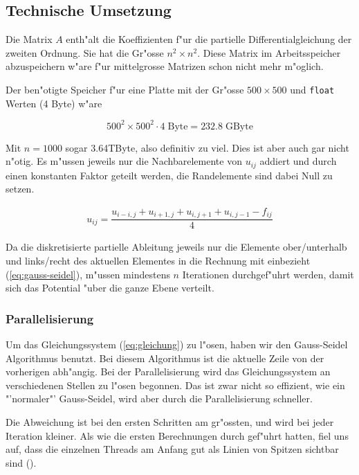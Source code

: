 \begin{refsection}
\subsection{Technische Umsetzung}

Die Matrix $A$ enth"alt die Koeffizienten f"ur die partielle
Differentialgleichung der zweiten Ordnung. Sie hat die Gr"osse $n^2
\times n^2$. Diese Matrix im Arbeitsspeicher abzuspeichern w"are
f"ur mittelgrosse Matrizen schon nicht mehr
m"oglich.\cite{mueller:hpcseminar}
	
Der ben"otigte Speicher f"ur eine Platte mit der Gr"osse $500 \times
500$ und \verb|float| Werten (4 Byte) w"are
	
\begin{equation}
500^2 \times 500^2 \cdot 4\;\mathrm{Byte} = 232.8\;\mathrm{GByte}
\end{equation}
	
Mit $n = 1000$ sogar 3.64\;TByte, also definitiv zu viel. Dies ist
aber auch gar nicht n"otig. Es m"ussen jeweils nur die Nachbarelemente
von $u_{ij}$ addiert und durch einen konstanten Faktor geteilt
werden, die Randelemente sind dabei Null zu setzen.

\begin{eqnarray}
	u_{ij} = \dfrac{u_{i-i,j}+u_{i+1,j}+u_{i,j+1}+u_{i,j-1}-f_{ij}}{4} \label{eq:gauss-seidel}
\end{eqnarray}
	
Da die diskretisierte partielle Ableitung jeweils nur die Elemente
ober/unterhalb und links/recht des aktuellen Elementes in die
Rechnung mit einbezieht (\ref{eq:gauss-seidel}), m"ussen mindestens
$n$ Iterationen durchgef"uhrt werden, damit sich das Potential "uber
die ganze Ebene verteilt.
	
\subsubsection{Parallelisierung}
	
Um das Gleichungssystem (\ref{eq:gleichung}) zu l"osen, haben wir
den Gauss-Seidel Algorithmus benutzt. Bei diesem Algorithmus ist
die aktuelle Zeile von der vorherigen abh"angig. Bei der Parallelisierung
wird das Gleichungssystem an verschiedenen Stellen zu l"osen begonnen.
Das ist zwar nicht so effizient, wie ein "'normaler"' Gauss-Seidel,
wird aber durch die Parallelisierung schneller.
		
Die Abweichung ist bei den ersten Schritten am gr"ossten, und wird
bei jeder Iteration kleiner. Als wie die ersten Berechnungen durch
gef"uhrt hatten, fiel uns auf, dass die einzelnen Threads am Anfang
gut als Linien von Spitzen sichtbar sind ().
		

\end{refsection}
